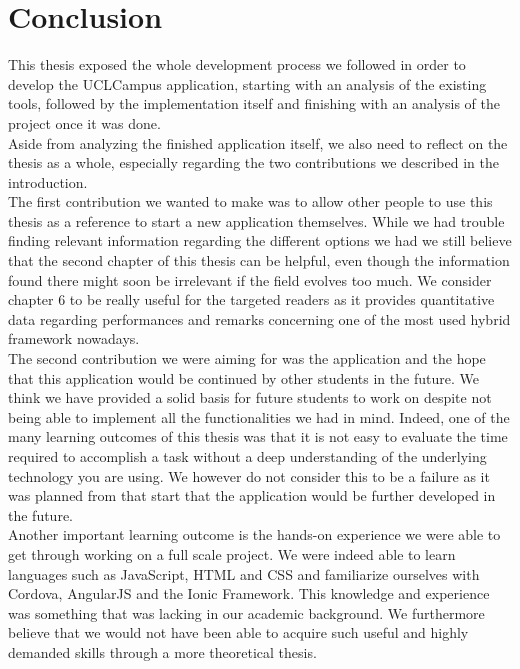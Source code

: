 \documentclass{eplmastersthesis}
\begin{document}
\chapter{Conclusion} 

This thesis exposed the whole development process we followed in order to develop the UCLCampus application, starting with an analysis of the existing tools, followed by the implementation itself and finishing with an analysis of the project once it was done.\\

Aside from analyzing the finished application itself, we also need to reflect on the thesis as a whole, especially regarding the two contributions we described in the introduction.\\

The first contribution we wanted to make was to allow other people to use this thesis as a reference to start a new application themselves. While we had trouble finding relevant information regarding the different options we had we still believe that the second chapter of this thesis can be helpful, even though the information found there might soon be irrelevant if the field evolves too much.
We consider chapter 6 to be really useful for the targeted readers as it provides quantitative data regarding performances and remarks concerning one of the most used hybrid framework nowadays.\\

The second contribution we were aiming for was the application and the hope that this application would be continued by other students in the future. We think we have provided a solid basis for future students to work on despite not being able to implement all the functionalities we had in mind. Indeed, one of the many learning outcomes of this thesis was that it is not easy to evaluate the time required to accomplish a task without a deep understanding of the underlying technology you are using. We however do not consider this to be a failure as it was planned from that start that the application would be further developed in the future.\\

Another important learning outcome is the hands-on experience we were able to get through working on a full scale project. We were indeed able to learn languages such as JavaScript, HTML and CSS and familiarize ourselves with Cordova, AngularJS and the Ionic Framework. This knowledge and experience was something that was lacking in our academic background. We furthermore believe that we would not have been able to acquire such useful and highly demanded skills through a more theoretical thesis.\\
\end{document}
